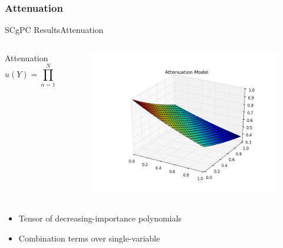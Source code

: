 \documentclass{beamer}
\begin{document}
\subsubsection{Attenuation}
\begin{frame}{SCgPC Results}{Attenuation}\vspace{-20pt}
  \begin{columns}
    \begin{column}{0.6\textwidth}
      \begin{block}{Attenuation}
        \[u(Y) = \prod_{n=1}^N \exp(-y_n/N)\]
      \end{block}
    \end{column}
    \begin{column}{0.4\textwidth}
        \begin{figure}[h!]
          \centering
          \includegraphics[width=\linewidth]{anlmodels/attenuate}
        \end{figure}
    \end{column}
  \end{columns}
  \begin{itemize}
    \item Tensor of decreasing-importance polynomials
    \item Combination terms over single-variable
  \end{itemize}
\end{frame}
\end{document}
